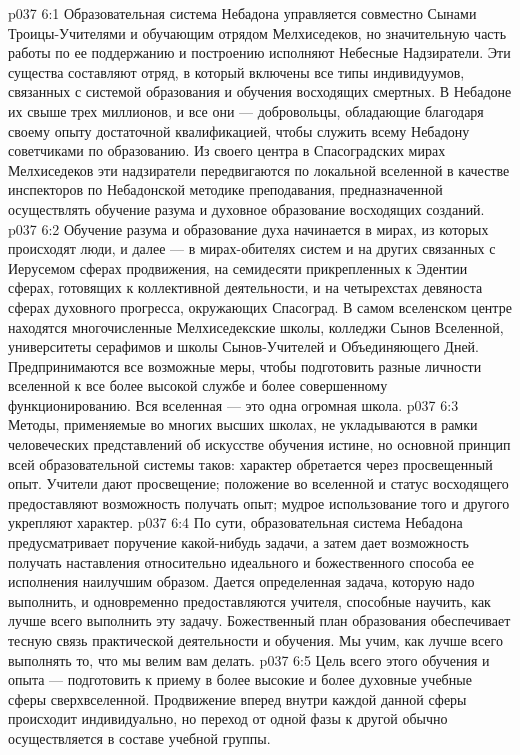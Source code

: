 \vs p037 6:1 Образовательная система Небадона управляется совместно Сынами Троицы\hyp{}Учителями и обучающим отрядом Мелхиседеков, но значительную часть работы по ее поддержанию и построению исполняют Небесные Надзиратели. Эти существа составляют отряд, в который включены все типы индивидуумов, связанных с системой образования и обучения восходящих смертных. В Небадоне их свыше трех миллионов, и все они --- добровольцы, обладающие благодаря своему опыту достаточной квалификацией, чтобы служить всему Небадону советчиками по образованию. Из своего центра в Спасоградских мирах Мелхиседеков эти надзиратели передвигаются по локальной вселенной в качестве инспекторов по Небадонской методике преподавания, предназначенной осуществлять обучение разума и духовное образование восходящих созданий.
\vs p037 6:2 Обучение разума и образование духа начинается в мирах, из которых происходят люди, и далее --- в мирах\hyp{}обителях систем и на других связанных с Иерусемом сферах продвижения, на семидесяти прикрепленных к Эдентии сферах, готовящих к коллективной деятельности, и на четырехстах девяноста сферах духовного прогресса, окружающих Спасоград. В самом вселенском центре находятся многочисленные Мелхиседекские школы, колледжи Сынов Вселенной, университеты серафимов и школы Сынов\hyp{}Учителей и Объединяющего Дней. Предпринимаются все возможные меры, чтобы подготовить разные личности вселенной к все более высокой службе и более совершенному функционированию. Вся вселенная --- это одна огромная школа.
\vs p037 6:3 \pc Методы, применяемые во многих высших школах, не укладываются в рамки человеческих представлений об искусстве обучения истине, но основной принцип всей образовательной системы таков: характер обретается через просвещенный опыт. Учители дают просвещение; положение во вселенной и статус восходящего предоставляют возможность получать опыт; мудрое использование того и другого укрепляют характер.
\vs p037 6:4 По сути, образовательная система Небадона предусматривает поручение какой\hyp{}нибудь задачи, а затем дает возможность получать наставления относительно идеального и божественного способа ее исполнения наилучшим образом. Дается определенная задача, которую надо выполнить, и одновременно предоставляются учителя, способные научить, как лучше всего выполнить эту задачу. Божественный план образования обеспечивает тесную связь практической деятельности и обучения. Мы учим, как лучше всего выполнять то, что мы велим вам делать.
\vs p037 6:5 \pc Цель всего этого обучения и опыта --- подготовить к приему в более высокие и более духовные учебные сферы сверхвселенной. Продвижение вперед внутри каждой данной сферы происходит индивидуально, но переход от одной фазы к другой обычно осуществляется в составе учебной группы.
